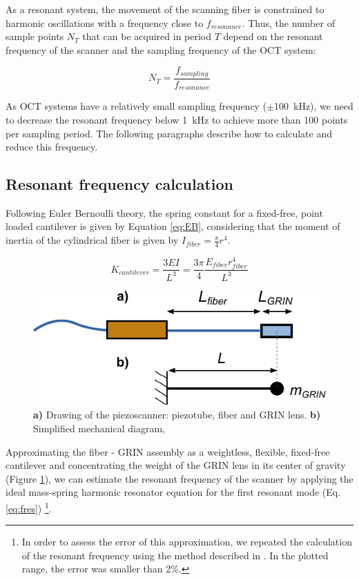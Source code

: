As a resonant system, the movement of the scanning fiber is constrained to harmonic oscillations with a frequency close to $f_{resonance}$. Thus, the number of sample points $N_{T}$ that can be acquired in period $T$ depend on the resonant frequency of the scanner and the sampling frequency of the OCT system:

\begin{equation}
N_{T} = \frac{f_{sampling}}{f_{resonance}}
\label{eq:nT}
\end{equation}

As OCT systems have a relatively small sampling frequency ($\pm$\SI{100}{\kilo\hertz}), we need to decrease the resonant frequency below \SI{1}{kHz} to achieve more than 100 points per sampling period. The following paragraphs describe how to calculate and reduce this frequency.

\subsection*{Resonant frequency calculation}
Following Euler Bernoulli theory, the spring constant for a fixed-free, point loaded cantilever is given by Equation \ref{eq:EB}, considering that the moment of inertia of the cylindrical fiber is given by $I_{fiber} = \frac{\pi}{4} r^4$.


\begin{equation}
K_{cantilever} = \frac{3 E I}{L^3} = \frac{3 \pi}{4} \frac{E_{fiber} r_{fiber}^4}{L^3}
\label{eq:EB}
\end{equation}

\begin{figure}[h!]\centering
      \includegraphics{figures/30_DesignSimulation/Mechanical/EB.pdf}
      \caption{\textbf{a)} Drawing of the piezoscanner: piezotube, fiber and GRIN lens. 
      \textbf{b)} Simplified mechanical diagram, }
      \label{fig:EB}
\end{figure}

Approximating the fiber - GRIN assembly as a weightless, flexible, fixed-free cantilever and concentrating the weight of the GRIN lens in its center of gravity (Figure \ref{fig:EB}), we can estimate the resonant frequency of the scanner by applying the ideal mass-spring harmonic resonator equation for the first resonant mode (Eq. \ref{eq:fres}) \footnote{In order to assess the error of this approximation, we repeated the calculation of the resonant frequency using the method described in \cite{Huo2010}. In the plotted range, the error was smaller than 2\%.}. 

